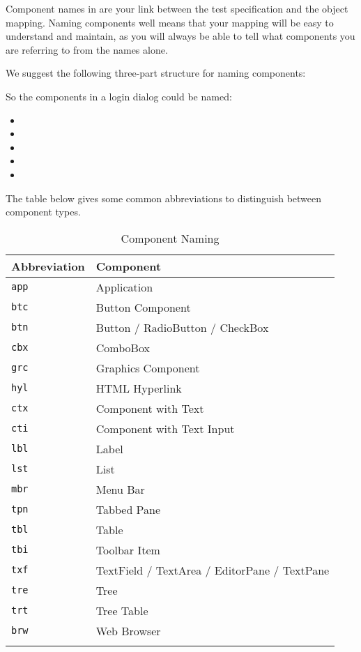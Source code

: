Component names in \app{} are your link between the test specification and the object mapping. Naming components well means that your mapping will be easy to understand and maintain, as you will always be able to tell what components you are referring to from the names alone. 

We suggest the following three-part structure for naming components:\\

So the components in a login dialog could be named:
\begin{itemize}
\item {}
\item {}
\item {}
\item {}
\item {}
\end{itemize}


The table below gives some common abbreviations to distinguish between component types. 

\begin{table}
\centering
\begin{tabular}{|l|l|}
\hline
{\bf Abbreviation} & {\bf Component} \\ \hline
{\tt app} & Application \\
{\tt btc} & Button Component \\
{\tt btn} & Button / RadioButton / CheckBox \\
{\tt cbx} & ComboBox \\
{\tt grc} & Graphics Component \\
{\tt hyl} & HTML Hyperlink \\
{\tt ctx} & Component with Text \\
{\tt cti} & Component with Text Input\\
{\tt lbl} & Label \\
{\tt lst} & List \\
{\tt mbr} & Menu Bar \\
{\tt tpn} & Tabbed Pane \\
{\tt tbl} & Table \\
{\tt tbi} & Toolbar Item \\
{\tt txf} & TextField / TextArea / EditorPane / TextPane \\
{\tt tre} & Tree\\
{\tt trt} & Tree Table \\
{\tt brw} & Web Browser \\
\\ \hline
\end{tabular}
\caption{Component Naming}
	\label{compconventions}
\end{table}
\bigskip
